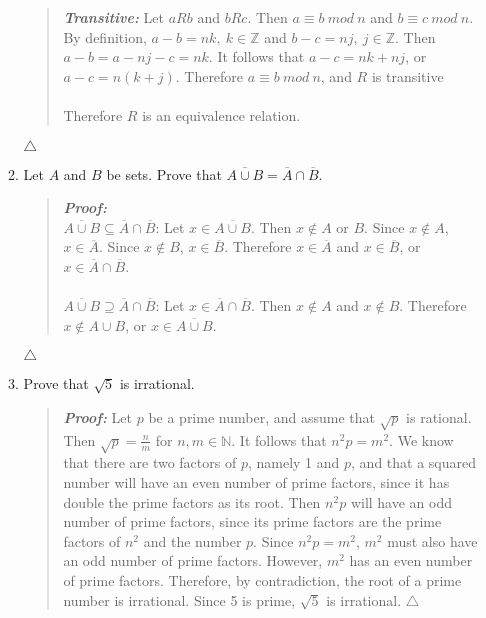 \documentclass{article}
\newcommand{\Proof}{\textit{\textbf{Proof: }}}
\newcommand{\NN}{\mathbb{N}}
\newcommand{\ZZ}{\mathbb{Z}}
\begin{document}
\begin{enumerate}
\begin{enumerate}
\begin{quote}
\textit{\textbf{Transitive:}} Let $aRb$ and $bRc$.
Then $a\equiv b\ mod\ n$ and $b\equiv c\ mod\ n$.
By definition, $a-b = nk,\ k\in\ZZ$ and $b - c = nj,\ j\in\ZZ$.
Then $a-b = a-nj-c = nk$.
It follows that $a-c = nk + nj$, or $a-c = n(k + j)$.
Therefore $a\equiv b\ mod\ n$, and $R$ is transitive\\\\
Therefore $R$ is an equivalence relation.
\end{quote}
$\triangle$
\item Let $A$ and $B$ be sets.
Prove that $\overline{A \cup B} = \overline{A} \cap \overline{B}$.
\begin{quote}
\Proof\\
{$\overline{A \cup B} \subseteq \overline{A} \cap \overline{B}$:}
Let $x\in\overline{A \cup B}$.
Then $x \notin A$ or $B$.
Since $x \notin A$, $x \in \overline{A}$.
Since $x \notin B$, $x \in \overline{B}$.
Therefore $x \in \overline{A}$ and $x\in\overline{B}$, or $x \in \overline{A} \cap \overline{B}$.\\\\
{$\overline{A \cup B} \supseteq \overline{A} \cap \overline{B}$:}
Let $x\in\overline{A} \cap \overline{B}$.
Then $x \notin A$ and $x \notin B$.
Therefore $x \notin A \cup B$, or $x \in \overline{A \cup B}$.
\end{quote}
$\triangle$
\item Prove that $\sqrt{5}$ is irrational.
\begin{quote}
\Proof Let $p$ be a prime number, and assume that $\sqrt{p}$ is rational.
Then $\sqrt{p} = \frac{n}{m}$ for $n,m \in \NN$.
It follows that $n^{2} p = m^{2}$.
We know that there are two factors of $p$, namely 1 and $p$, and that a squared number will have an even number of prime factors, since it has double the prime factors as its root.
Then $n^{2}p$ will have an odd number of prime factors, since its prime factors are the prime factors of $n^{2}$ and the number $p$.
Since $n^{2}p = m^{2}$, $m^{2}$ must also have an odd number of prime factors.
However, $m^{2}$ has an even number of prime factors.
Therefore, by contradiction, the root of a prime number is irrational.
Since 5 is prime, $\sqrt{5}$ is irrational. $\triangle$
\end{quote}
\end{enumerate}
\end{enumerate}
\end{document}
